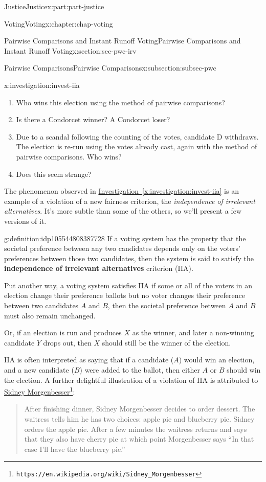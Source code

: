 \documentclass[oneside,10pt,]{book}
\newcommand{\xreffont}{\relax}
\newcommand{\terminology}[1]{\textbf{#1}}
\numberwithin{equation}{section}
\begin{document}
\begin{partptx}{Justice}{}{Justice}{}{}{x:part:part-justice}
\begin{chapterptx}{Voting}{}{Voting}{}{}{x:chapter:chap-voting}
\begin{sectionptx}{Pairwise Comparisons and Instant Runoff Voting}{}{Pairwise Comparisons and Instant Runoff Voting}{}{}{x:section:sec-pwc-irv}
\begin{subsectionptx}{Pairwise Comparisons}{}{Pairwise Comparisons}{}{}{x:subsection:subsec-pwc}
\begin{investigation}{}{x:investigation:invest-iia}
%
\begin{enumerate}
\item{}Who wins this election using the method of pairwise comparisons?%
\item{}Is there a Condorcet winner? A Condorcet loser?%
\item{}Due to a scandal following the counting of the votes, candidate D withdraws. The election is re-run using the votes already cast, again with the method of pairwise comparisons. Who wins?%
\item{}Does this seem strange?%
\end{enumerate}
\end{investigation}%
The phenomenon observed in \hyperref[x:investigation:invest-iia]{Investigation~{\xreffont\ref{x:investigation:invest-iia}}} is an example of a violation of a new fairness criterion, the \emph{independence of irrelevant alternatives}. It's more subtle than some of the others, so we'll present a few versions of it.%
\begin{definition}{}{g:definition:idp105544808387728}%
If a voting system has the property that the societal preference between any two candidates depends only on the voters' preferences between those two candidates, then the system is said to satisfy the \terminology{independence of irrelevant alternatives} criterion (IIA).%
\par
Put another way, a voting system satisfies IIA if some or all of the voters in an election change their preference ballots but no voter changes their preference between two candidates \(A\) and \(B\), then the societal preference between \(A\) and \(B\) must also remain unchanged.%
\par
Or, if an election is run and produces \(X\) as the winner, and later a non-winning candidate \(Y\) drops out, then \(X\) should still be the winner of the election.%
\end{definition}
IIA is often interpreted as saying that if a candidate (\(A\)) would win an election, and a new candidate (\(B\)) were added to the ballot, then either \(A\) or \(B\) should win the election. A further delightful illustration of a violation of IIA is attributed to \href{https://en.wikipedia.org/wiki/Sidney_Morgenbesser}{Sidney Morgenbesser}\footnote{\nolinkurl{https://en.wikipedia.org/wiki/Sidney_Morgenbesser}\label{g:fn:idp105544808262800}}:%
\begin{quote}%
After finishing dinner, Sidney Morgenbesser decides to order dessert. The waitress tells him he has two choices: apple pie and blueberry pie. Sidney orders the apple pie. After a few minutes the waitress returns and says that they also have cherry pie at which point Morgenbesser says ``In that case I'll have the blueberry pie.''\end{quote}

\end{subsectionptx}
\end{sectionptx}
\end{chapterptx}
\end{partptx}
\end{document}
